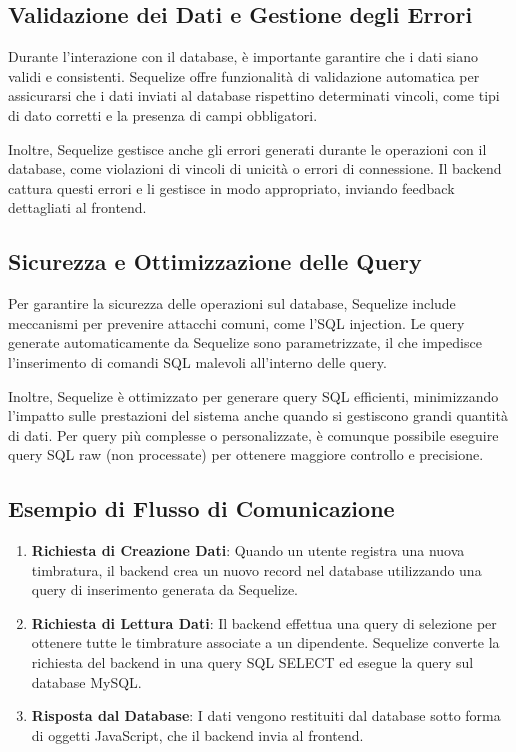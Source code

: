 \documentclass[twoside]{supsistudent}
\begin{document}
\subsection{Validazione dei Dati e Gestione degli Errori}

Durante l'interazione con il database, è importante garantire che i dati siano validi e consistenti. Sequelize offre funzionalità di validazione automatica per assicurarsi che i dati inviati al database rispettino determinati vincoli, come tipi di dato corretti e la presenza di campi obbligatori.

Inoltre, Sequelize gestisce anche gli errori generati durante le operazioni con il database, come violazioni di vincoli di unicità o errori di connessione. Il backend cattura questi errori e li gestisce in modo appropriato, inviando feedback dettagliati al frontend.

\subsection{Sicurezza e Ottimizzazione delle Query}

Per garantire la sicurezza delle operazioni sul database, Sequelize include meccanismi per prevenire attacchi comuni, come l'SQL injection. Le query generate automaticamente da Sequelize sono parametrizzate, il che impedisce l'inserimento di comandi SQL malevoli all'interno delle query.

Inoltre, Sequelize è ottimizzato per generare query SQL efficienti, minimizzando l'impatto sulle prestazioni del sistema anche quando si gestiscono grandi quantità di dati. Per query più complesse o personalizzate, è comunque possibile eseguire query SQL raw (non processate) per ottenere maggiore controllo e precisione.

\subsection{Esempio di Flusso di Comunicazione}

\begin{enumerate}
  \item \textbf{Richiesta di Creazione Dati}: Quando un utente registra una nuova timbratura, il backend crea un nuovo record nel database utilizzando una query di inserimento generata da Sequelize.

  \item \textbf{Richiesta di Lettura Dati}: Il backend effettua una query di selezione per ottenere tutte le timbrature associate a un dipendente. Sequelize converte la richiesta del backend in una query SQL SELECT ed esegue la query sul database MySQL.

  \item \textbf{Risposta dal Database}: I dati vengono restituiti dal database sotto forma di oggetti JavaScript, che il backend invia al frontend.
\end{enumerate}
\end{document}
